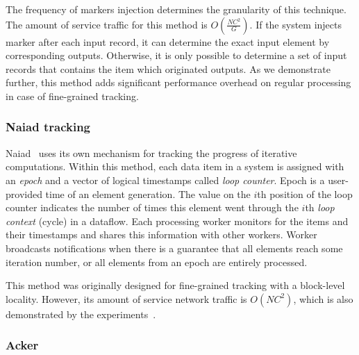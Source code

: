 The frequency of markers injection determines the granularity of this technique. The amount of service traffic for this method is $O(\frac{NC^2}{G})$. If the system injects marker after each input record, it can determine the exact input element by corresponding outputs. Otherwise, it is only possible to determine a set of input records that contains the item which originated outputs. As we demonstrate further, this method adds significant performance overhead on regular processing in case of fine-grained tracking.

\subsubsection{Naiad tracking}

Naiad~\cite{Murray:2013:NTD:2517349.2522738} uses its own mechanism for tracking the progress of iterative computations. Within this method, each data item in a system is assigned with an {\em epoch} and a vector of logical timestamps called {\em loop counter}. Epoch is a user-provided time of an element generation. The value on the $i$th position of the loop counter indicates the number of times this element went through the $i$th {\em loop context} (cycle) in a dataflow. Each processing worker monitors for the items and their timestamps and shares this information with other workers. Worker broadcasts notifications when there is a guarantee that all elements reach some iteration number, or all elements from an epoch are entirely processed.

This method was originally designed for fine-grained tracking with a block-level locality. However, its amount of service network traffic is $O(NC^2)$, which is also demonstrated by the experiments~\cite{Murray:2013:NTD:2517349.2522738}.



\subsubsection{Acker}

